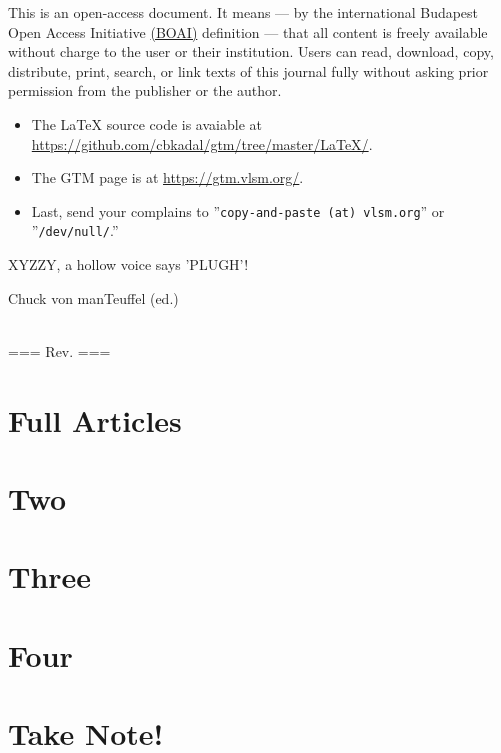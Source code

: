\documentclass[12pt]{book}
\newcommand{\pengarangs}{%
    Chuck von manTeuffel (ed.)
}
\begin{document}
This is an open-access document.
It means 
--- by the international Budapest Open Access Initiative 
\href{https://www.budapestopenaccessinitiative.org/}{(BOAI)}
definition --- that all content is freely available without charge to the user or their institution.
Users can read, download, copy, distribute, print, search, 
or link texts of this journal fully without asking prior permission from the publisher or the author.

\begin{itemize}
\item The \LaTeX{} source code is avaiable at \url{https://github.com/cbkadal/gtm/tree/master/LaTeX/}.
\item The GTM page is at \url{https://gtm.vlsm.org/}.
\item Last, send your complains to ''\texttt{copy-and-paste (at) vlsm.org}'' or ''\texttt{/dev/null/}.''
\end{itemize}

XYZZY, a hollow voice says 'PLUGH'!

\noindent
\pengarangs
\\[6pt]
\noindent
=== \smallskip Rev. \rev{} \medskip \smallskip ===

\newpage


\part{Full Articles}

\part{Two}

\part{Three}

\part{Four}

\part{Take Note!}


\end{document}
